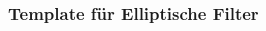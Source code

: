 %
%
%
\bgroup
\begin{frame}[t]
\setlength{\abovedisplayskip}{5pt}
\setlength{\belowdisplayskip}{5pt}
\frametitle{Template für Elliptische Filter}
\vspace{-20pt}
\begin{columns}[t,onlytextwidth]
\begin{column}{0.48\textwidth}
\end{column}
\begin{column}{0.48\textwidth}
\end{column}
\end{columns}
\end{frame}
\egroup
